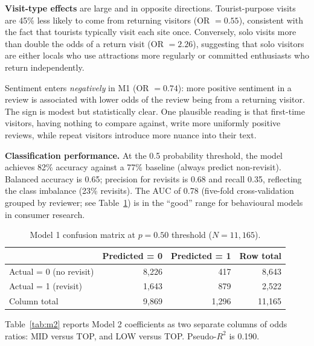 \documentclass[10pt,a4paper]{article}
\newcommand{\subsect}[1]{\vspace{6pt}\noindent{\large\bfseries #1}\par\vspace{2pt}}
\begin{document}
\textbf{Visit-type effects} are large and in opposite directions.
Tourist-purpose visits are 45\% less likely to come from returning
visitors (OR $= 0.55$), consistent with the fact that tourists typically
visit each site once. Conversely, solo visits more than double the odds
of a return visit (OR $= 2.26$), suggesting that solo visitors are
either locals who use attractions more regularly or committed enthusiasts
who return independently.

Sentiment enters \emph{negatively} in M1 (OR $= 0.74$): more positive
sentiment in a review is associated with lower odds of the review being
from a returning visitor. The sign is modest but statistically clear.
One plausible reading is that first-time visitors, having nothing to
compare against, write more uniformly positive reviews, while repeat
visitors introduce more nuance into their text.

\textbf{Classification performance.} At the 0.5 probability threshold,
the model achieves 82\% accuracy against a 77\% baseline (always predict
non-revisit). Balanced accuracy is 0.65; precision for revisits is 0.68
and recall 0.35, reflecting the class imbalance (23\% revisits). The
AUC of 0.78 (five-fold cross-validation grouped by reviewer; see
Table~\ref{tab:cm1}) is in the ``good'' range for behavioural models in
consumer research.

\begin{table}[H]\centering
\caption{Model 1 confusion matrix at $p = 0.50$ threshold
($N = 11{,}165$).}
\label{tab:cm1}
\footnotesize
\begin{tabular}{@{}lrrr@{}}
\toprule
                     & Predicted = 0 & Predicted = 1 & Row total \\
\midrule
Actual = 0 (no revisit) & 8{,}226 &   417 & 8{,}643 \\
Actual = 1 (revisit)    & 1{,}643 &   879 & 2{,}522 \\
\midrule
Column total            & 9{,}869 & 1{,}296 & 11{,}165 \\
\bottomrule
\end{tabular}
\end{table}

\subsect{4.2 Model 2 — Rating}

Table~\ref{tab:m2} reports Model 2 coefficients as two separate
columns of odds ratios: MID versus TOP, and LOW versus TOP. Pseudo-$R^2$
is 0.190.
\end{document}
